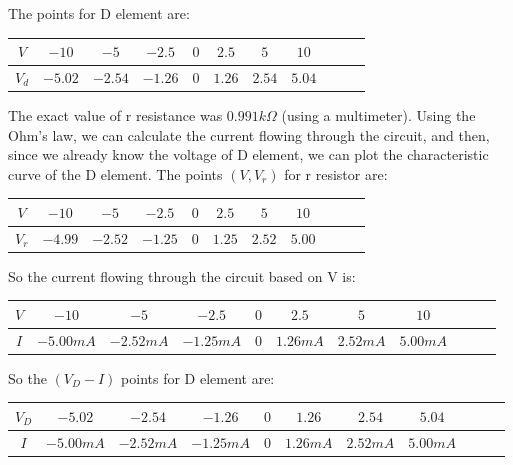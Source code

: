 \documentclass[11pt]{article}
\begin{document}
\begin{question}
\begin{subquestion}
{            The points for D element are:
            \begin{table}[H]
                \centering
                \begin{tabular}{|c|c|c|c|c|c|c|c|c|c|c|}
                    \hline
                    $V$   & $-10$   & $-5$    & $-2.5$  & $0$ & $2.5$  & $5$    & $10$   \\ \hline
                    $V_d$ & $-5.02$ & $-2.54$ & $-1.26$ & $0$ & $1.26$ & $2.54$ & $5.04$ \\ \hline
                \end{tabular}
            \end{table}

            The exact value of r resistance was $0.991k\Omega$ (using a multimeter).
            Using the Ohm's law, we can calculate the current flowing through the circuit, and then,
            since we already know the voltage of D element, we can plot the characteristic curve of the D element.
            The points $(V,V_r)$ for r resistor are:
            \begin{table}[H]
                \centering
                \begin{tabular}{|c|c|c|c|c|c|c|c|c|c|c|}
                    \hline
                    $V$   & $-10$   & $-5$    & $-2.5$  & $0$ & $2.5$  & $5$    & $10$   \\ \hline
                    $V_r$ & $-4.99$ & $-2.52$ & $-1.25$ & $0$ & $1.25$ & $2.52$ & $5.00$ \\ \hline
                \end{tabular}
            \end{table}

            So the current flowing through the circuit based on V is:
            \begin{table}[H]
                \centering
                \begin{tabular}{|c|c|c|c|c|c|c|c|c|c|c|}
                    \hline
                    $V$ & $-10$     & $-5$      & $-2.5$    & $0$ & $2.5$    & $5$      & $10$     \\ \hline
                    $I$ & $-5.00mA$ & $-2.52mA$ & $-1.25mA$ & $0$ & $1.26mA$ & $2.52mA$ & $5.00mA$ \\ \hline
                \end{tabular}
            \end{table}

            So the $(V_D - I)$ points for D element are:
            \begin{table}[H]
                \centering
                \begin{tabular}{|c|c|c|c|c|c|c|c|c|c|c|}
                    \hline
                    $V_D$ & $-5.02$   & $-2.54$   & $-1.26$   & $0$ & $1.26$   & $2.54$   & $5.04$   \\ \hline
                    $I$   & $-5.00mA$ & $-2.52mA$ & $-1.25mA$ & $0$ & $1.26mA$ & $2.52mA$ & $5.00mA$ \\ \hline
                \end{tabular}
            \end{table}

}
\end{subquestion}
\end{question}
\end{document}

